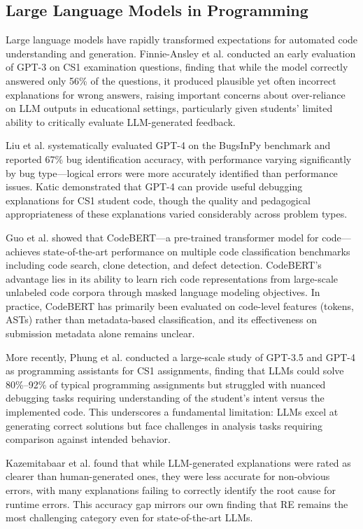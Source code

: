 \documentclass[10pt,letterpaper]{article}
\begin{document}
\subsection{Large Language Models in Programming}

Large language models have rapidly transformed expectations for automated code
understanding and generation. Finnie-Ansley et al. \cite{finnie2022robots}
conducted an early evaluation of GPT-3 on CS1 examination questions, finding
that while the model correctly answered only 56\% of the questions, it
produced plausible yet often incorrect explanations for wrong answers,
raising important concerns about over-reliance on LLM outputs in educational
settings, particularly given students' limited ability to critically evaluate
LLM-generated feedback.

Liu et al. \cite{huang2025template} systematically evaluated GPT-4 on the
BugsInPy benchmark and reported 67\% bug identification accuracy, with
performance varying significantly by bug type---logical errors were more
accurately identified than performance issues. Katic \cite{raihan2025large}
demonstrated that GPT-4 can provide useful debugging explanations for CS1
student code, though the quality and pedagogical appropriateness of these
explanations varied considerably across problem types.

Guo et al. \cite{feng2020codebert} showed that CodeBERT---a pre-trained
transformer model for code---achieves state-of-the-art performance on multiple
code classification benchmarks including code search, clone detection, and
defect detection. CodeBERT's advantage lies in its ability to learn rich code
representations from large-scale unlabeled code corpora through masked
language modeling objectives. In practice, CodeBERT has primarily been evaluated
on code-level features (tokens, ASTs) rather than metadata-based
classification, and its effectiveness on submission metadata alone remains
unclear.

More recently, Phung et al. \cite{zamfirescu2023what} conducted a large-scale
study of GPT-3.5 and GPT-4 as programming assistants for CS1 assignments,
finding that LLMs could solve 80\%--92\% of typical programming assignments
but struggled with nuanced debugging tasks requiring understanding of the
student's intent versus the implemented code. This underscores a fundamental
limitation: LLMs excel at generating correct solutions but face challenges in
analysis tasks requiring comparison against intended behavior.

Kazemitabaar et al. \cite{kazemitabaar2024impact} found that while LLM-generated
explanations were rated as clearer than human-generated ones, they were
less accurate for non-obvious errors, with many explanations failing to
correctly identify the root cause for runtime errors. This accuracy gap
mirrors our own finding that RE remains the most challenging category even for
state-of-the-art LLMs.
\end{document}
